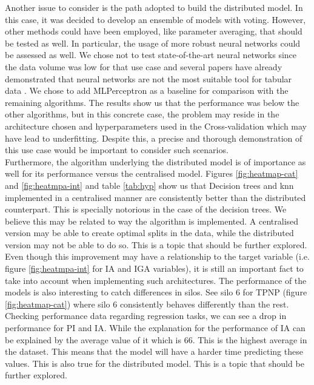 Another issue to consider is the path adopted to build the distributed model. In this case, it was decided to develop an ensemble of models with voting. However, other methods could have been employed, like parameter averaging, that should be tested as well. In particular, the usage of more robust neural networks could be assessed as well. We chose not to test state-of-the-art neural networks since the data volume was low for that use case and several papers have already demonstrated that neural networks are not the most suitable tool for tabular data \cite{grinsztajnWhyTreebasedModels2022,borisovDeepNeuralNetworks2022}. We chose to add MLPerceptron as a baseline for comparison with the remaining algorithms. The results show us that the performance was below the other algorithms, but in this concrete case, the problem may reside in the architecture chosen and hyperparameters used in the Cross-validation which may have lead to underfitting. Despite this, a precise and thorough demonstration of this use case would be important to consider such scenarios. \\
Furthermore, the algorithm underlying the distributed model is of importance as well for its performance versus the centralised model. Figures \ref{fig:heatmap-cat} and \ref{fig:heatmpa-int} and table \ref{tab:hyp} show us that Decision trees and \ac{knn} implemented in a centralised manner are consistently better than the distributed counterpart. This is specially notorious in the case of the decision trees. We believe this may be related to way the algorithm is implemented. A centralised version may be able to create optimal splits in the data, while the distributed version may not be able to do so. This is a topic that should be further explored.\\
Even though this improvement may have a relationship to the target variable (i.e. figure \ref{fig:heatmpa-int} for IA and IGA variables), it is still an important fact to take into account when implementing such architectures.
The performance of the models is also interesting to catch differences in silos. See silo 6 for TPNP (figure \ref{fig:heatmap-cat}) where silo 6 consistently behaves differently than the rest.
Checking performance data regarding regression tasks, we can see a drop in performance for PI and IA. While the explanation for the performance of IA can be explained by the average value of it which is 66. This is the highest average in the dataset. This means that the model will have a harder time predicting these values. This is also true for the distributed model. This is a topic that should be further explored.\\

